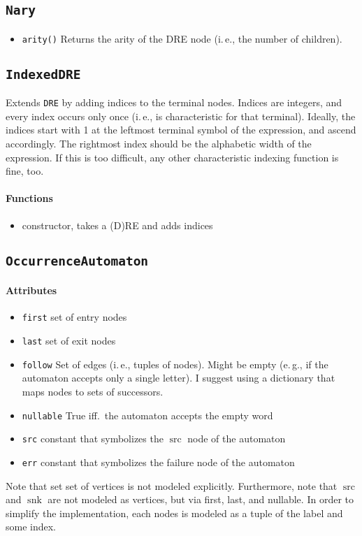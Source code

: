 \documentclass[a4paper,11pt, svgnames,titlepage]{article}
\DeclareMathOperator{\src}{src}
\DeclareMathOperator{\snk}{snk}
\begin{document}
\subsection{\texttt{Nary}}\label{sec:des:nary}
\begin{itemize}
	\item\texttt{arity()} Returns the arity of the DRE node (i.\,e., the number of children).
\end{itemize}


\subsection{\texttt{IndexedDRE}}\label{sec:des:idre}
Extends \texttt{DRE} by adding indices to the terminal nodes. Indices are integers, and every index occurs only once (i.\,e., is characteristic for that terminal). Ideally, the indices start with 1 at the leftmost terminal symbol of the expression, and ascend accordingly. The rightmost index should be the alphabetic width of the expression. If this is too difficult, any other characteristic indexing function is fine, too.
\paragraph{Functions}
\begin{itemize}
	\item constructor, takes a (D)RE and adds indices
\end{itemize}

\subsection{\texttt{OccurrenceAutomaton}}\label{sec:des:oa}
\paragraph{Attributes}
\begin{itemize}
	\item\texttt{first} set of entry nodes
	\item\texttt{last} set of exit nodes
	\item\texttt{follow} Set of edges (i.\,e., tuples of nodes). Might be empty (e.\,g., if the automaton accepts only a single letter). I suggest using a dictionary that maps nodes to sets of successors. 
	\item\texttt{nullable} True iff.\ the automaton accepts the empty word
	\item\texttt{src} constant that symbolizes the $\src$ node of the automaton
	\item\texttt{err} constant that symbolizes the failure node of the automaton	
\end{itemize}
Note that set set of vertices is not modeled explicitly. Furthermore, note that $\src$ and $\snk$ are not modeled as vertices, but via first, last, and nullable. In order to simplify the implementation, each nodes is modeled as a tuple of the label and some index.
\end{document}
